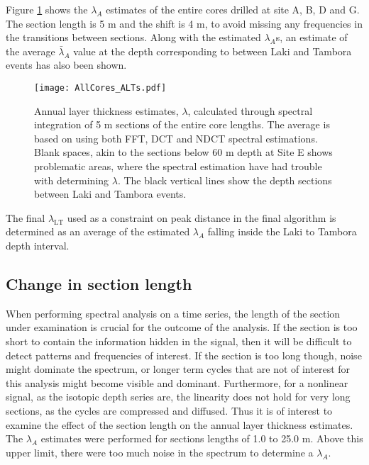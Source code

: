 \documentclass[../../CompleteThesis2/Complete_2ndDraft]{subfiles}
\begin{document}
Figure \ref{Fig:AllCores_ALT_l5_s4} shows the $\lambda_A$ estimates of the entire cores drilled at site A, B, D and G. The section length is 5 m and the shift is 4 m, to avoid missing any frequencies in the transitions between sections. Along with the estimated $\lambda_A$s, an estimate of the average $\bar{\lambda}_A$ value at the depth corresponding to between Laki and Tambora events has also been shown. 


\begin{figure}[h]
	\centering
	\texttt{[image: AllCores\_ALTs.pdf]}
	\caption[$\lambda$ for full cores]{\small Annual layer thickness estimates, $\lambda$, calculated through spectral integration of 5 m sections of the entire core lengths. The average is based on using both FFT, DCT and NDCT spectral estimations. Blank spaces, akin to the sections below 60 m depth at Site E shows problematic areas, where the spectral estimation have had trouble with determining $\lambda$. The black vertical lines show the depth sections between Laki and Tambora events.}
	\label{Fig:AllCores_ALT_l5_s4}
\end{figure}

The final $\lambda_{\text{LT}}$ used as a constraint on peak distance in the final algorithm is determined as an average of the estimated $\lambda_A$ falling inside the Laki to Tambora depth interval.

\subsection[Change in $l_{sec}$]{Change in section length}
\label{Subsec:SignalAnalysis_SpectralAnalysis_ALT_lsec}

When performing spectral analysis on a time series, the length of the section under examination is crucial for the outcome of the analysis. If the section is too short to contain the information hidden in the signal, then it will be difficult to detect patterns and frequencies of interest. If the section is too long though, noise might dominate the spectrum, or longer term cycles that are not of interest for this analysis might become visible and dominant. Furthermore, for a nonlinear signal, as the isotopic depth series are, the linearity does not hold for very long sections, as the cycles are compressed and diffused. Thus it is of interest to examine the effect of the section length on the annual layer thickness estimates. The $\lambda_A$ estimates were performed for sections lengths of 1.0 to 25.0 m. Above this upper limit, there were too much noise in the spectrum to determine a $\lambda_A$.
\end{document}
